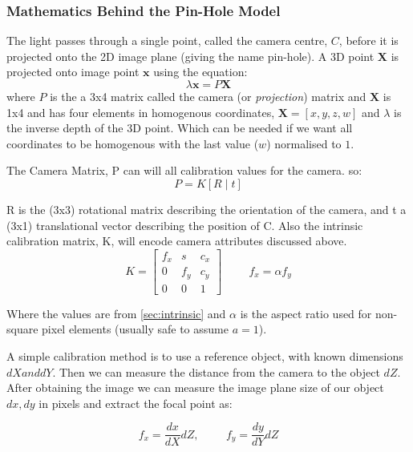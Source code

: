 \subsubsection{Mathematics Behind the Pin-Hole Model}
The light passes through a single point, called the camera centre, $C$, before it is projected onto the 2D image plane (giving the name pin-hole). 
A 3D point $\textbf{X}$ is projected onto image point $\textbf{x}$ using the equation:
\[\lambda \textbf{x} = P\textbf{X}\]
where $P$ is the a 3x4 matrix called the camera (or \emph{projection}) matrix and $\textbf{X}$ is 1x4 and has four elements in homogenous coordinates, \(\textbf{X} = [x, y, z, w]\) and $\lambda$ is the inverse depth of the 3D point. Which can be needed if we want all coordinates to be homogenous with the last value ($w$) normalised to $1$.

The Camera Matrix, P can will all calibration values for the camera. so:
\[P = K \left[R \mid t\right] \]

R is the (3x3) rotational matrix describing the orientation of the camera, and t a (3x1) translational vector describing the position of C.
Also the intrinsic calibration matrix, K, will encode camera attributes discussed above.
\[
  K = 
  \begin{bmatrix}
    f_x & s & c_x \\
    0 & f_y & c_y \\
    0 & 0 & 1
  \end{bmatrix}
  \hspace{1cm}
  f_x = \alpha f_y
\]

Where the values are from \ref{sec:intrinsic} and $\alpha$ is the aspect ratio used for non-square pixel elements (usually safe to assume $a=1$).

A simple calibration method is to use a reference object, with known dimensions $dX and dY$. Then we can measure the distance from the camera to the object $dZ$. After obtaining the image we can measure the image plane size of our object $dx, dy$ in pixels and extract the focal point as:

\[ 
  f_x = \frac{dx}{dX} dZ , \hspace{1cm} f_y = \frac{dy}{dY}dZ
\]

